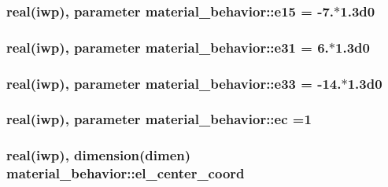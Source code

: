 \subsubsection[{e15}]{\setlength{\rightskip}{0pt plus 5cm}real(iwp), parameter material\+\_\+behavior\+::e15 = -\/7.$\ast$1.\+3d0}\label{classmaterial__behavior_a41c97072565322765eab89326d043974}
\hypertarget{classmaterial__behavior_acdda737936afdd1e2f7fa95ac0ec1e47}{}
\subsubsection[{e31}]{\setlength{\rightskip}{0pt plus 5cm}real(iwp), parameter material\+\_\+behavior\+::e31 = 6.$\ast$1.\+3d0}\label{classmaterial__behavior_acdda737936afdd1e2f7fa95ac0ec1e47}
\hypertarget{classmaterial__behavior_adecdfb65aad0a27a4cfecf7a0a2e7405}{}
\subsubsection[{e33}]{\setlength{\rightskip}{0pt plus 5cm}real(iwp), parameter material\+\_\+behavior\+::e33 = -\/14.$\ast$1.\+3d0}\label{classmaterial__behavior_adecdfb65aad0a27a4cfecf7a0a2e7405}
\hypertarget{classmaterial__behavior_aba1ffb56b1ab0b9db9d3b8bab9babf69}{}
\subsubsection[{ec}]{\setlength{\rightskip}{0pt plus 5cm}real(iwp), parameter material\+\_\+behavior\+::ec =1}\label{classmaterial__behavior_aba1ffb56b1ab0b9db9d3b8bab9babf69}
\hypertarget{classmaterial__behavior_a1deebdb156ef27ce0d628eeadc3ea304}{}
\subsubsection[{el\+\_\+center\+\_\+coord}]{\setlength{\rightskip}{0pt plus 5cm}real(iwp), dimension(dimen) material\+\_\+behavior\+::el\+\_\+center\+\_\+coord}\label{classmaterial__behavior_a1deebdb156ef27ce0d628eeadc3ea304}
\hypertarget{classmaterial__behavior_a3ade0d21c66ab32510bf21daeb7fc6a8}{}
